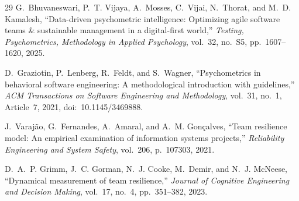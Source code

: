 \documentclass[conference]{IEEEtran}
\begin{document}
\begin{thebibliography}{29}
G.~Bhuvaneswari, P.~T. Vijaya, A.~Mosses, C.~Vijai, N.~Thorat, and
M.~D. Kamalesh,
``Data-driven psychometric intelligence: Optimizing agile software
teams \& sustainable management in a digital-first world,''
\textit{Testing, Psychometrics, Methodology in Applied Psychology},
vol.~32, no.~S5, pp.~1607--1620, 2025.

D.~Graziotin, P.~Lenberg, R.~Feldt, and S.~Wagner,
``Psychometrics in behavioral software engineering: A methodological
introduction with guidelines,''
\textit{ACM Transactions on Software Engineering and Methodology},
vol.~31, no.~1, Article~7, 2021,
doi:~10.1145/3469888.

J.~Varaj\~{a}o, G.~Fernandes, A.~Amaral, and A.~M. Gon\c{c}alves,
``Team resilience model: An empirical examination of information
systems projects,''
\textit{Reliability Engineering and System Safety},
vol.~206, p.~107303, 2021.

D.~A.~P. Grimm, J.~C. Gorman, N.~J. Cooke, M.~Demir, and
N.~J. McNeese,
``Dynamical measurement of team resilience,''
\textit{Journal of Cognitive Engineering and Decision Making},
vol.~17, no.~4, pp.~351--382, 2023.

\end{thebibliography}
\end{document}
